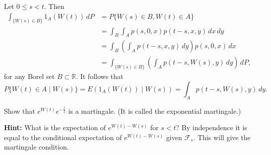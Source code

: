 \begin{Solution}
Let $0 \leq s < t$. Then
\begin{equation}
\begin{aligned}
\int_{\{W(s) \in B\}} 1_A(W(t)) \, dP &= P\{W(s) \in B, W(t) \in A\} \\
&= \int_B \int_A p(s, 0, x) p(t - s, x, y) \, dx \, dy \\
&= \int_B \left(\int_A p(t - s, x, y) \, dy\right) p(s, 0, x) \, dx \\
&= \int_{\{W(s) \in B\}} \left(\int_A p(t - s, W(s), y) \, dy\right) \, dP,
\end{aligned}
\end{equation}
for any Borel set $B \subset \mathbb{R}$. It follows that
\[
P\{W(t) \in A \mid W(s)\} = E(1_A(W(t)) \mid W(s)) = \int_A p(t - s, W(s), y) \, dy.
\]
\end{Solution}

\begin{Exercise}
\label{ex:exponential-martingale}
Show that $e^{W(t)} e^{-\frac{t}{2}}$ is a martingale. (It is called the exponential martingale.)

\noindent\textbf{Hint:} What is the expectation of $e^{W(t) - W(s)}$ for $s < t$? By independence it is equal to the conditional expectation of $e^{W(t) - W(s)}$ given $\mathcal{F}_s$. This will give the martingale condition.
\end{Exercise}

